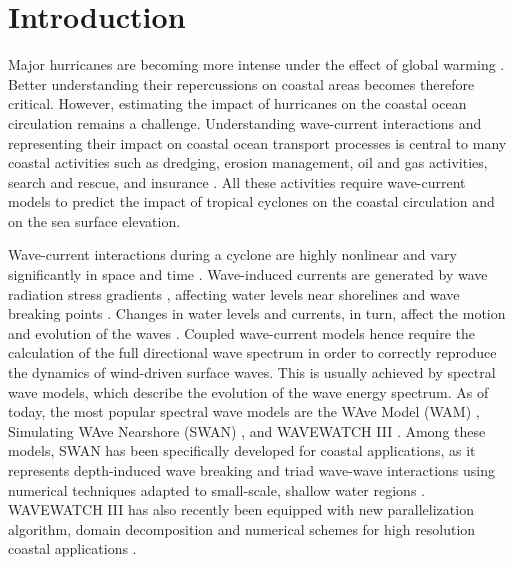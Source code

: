 \section{Introduction}

Major hurricanes are becoming more intense under the effect of global warming \citep{bhatia2019recent, knutson2020tropical}. Better understanding their repercussions on coastal areas becomes therefore critical. However, estimating the impact of hurricanes on the coastal ocean circulation remains a challenge. Understanding wave-current interactions and representing their impact on coastal ocean transport processes is central to many coastal activities such as dredging, erosion management, oil and gas activities, search and rescue, and insurance \citep{bever2013simulating,li1998three, breivik2013advances}. All these activities require wave-current models to predict the impact of tropical cyclones on the coastal circulation and on the sea surface elevation.

Wave-current interactions during a cyclone are highly nonlinear and vary significantly in space and time \citep{wu2011fvcom}. Wave-induced currents are generated by wave radiation stress gradients \citep{longuet1970longshore}, affecting water levels near shorelines and wave breaking points \citep{longuet1964radiation}. Changes in water levels and currents, in turn, affect the motion and evolution of the waves \citep{sikiric2013coupling}. Coupled wave-current models hence require the calculation of the full directional wave spectrum in order to correctly reproduce the dynamics of wind-driven surface waves. This is usually achieved by spectral wave models, which describe the evolution of the wave energy spectrum. As of today, the most popular spectral wave models are the WAve Model (WAM) \citep{group1988wam}, %
Simulating WAve Nearshore (SWAN) \citep{booij1999third}, and WAVEWATCH III \citep{tolman2009user}. Among these models, SWAN has been specifically developed for coastal applications, as it represents depth-induced wave breaking and triad wave-wave interactions using numerical techniques adapted to small-scale, shallow water regions \citep{booij1999third}. WAVEWATCH III has also recently been equipped with new parallelization algorithm, domain decomposition and numerical schemes for high resolution coastal applications \citep{ww3dg,abdolali2020large}.

